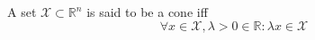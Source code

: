 A set $\mathcal{X} \subset \mathbb{R}^n$ is said to be a cone iff
$$\forall x \in \mathcal{X}, \lambda > 0 \in \mathbb{R} : \lambda x \in \mathcal{X}$$
